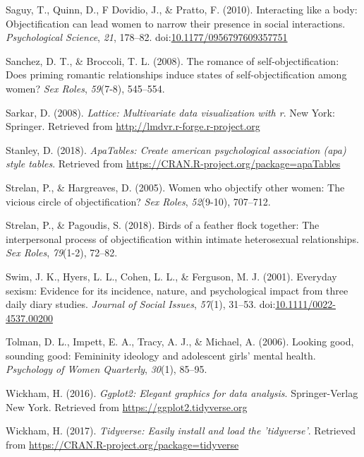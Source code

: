 \documentclass[man]{apa6}
\begin{document}
\hypertarget{ref-saguyetal2010}{}
Saguy, T., Quinn, D., F Dovidio, J., \& Pratto, F. (2010). Interacting
like a body: Objectification can lead women to narrow their presence in
social interactions. \emph{Psychological Science}, \emph{21}, 178--82.
doi:\href{https://doi.org/10.1177/0956797609357751}{10.1177/0956797609357751}

\hypertarget{ref-sanchez2008romance}{}
Sanchez, D. T., \& Broccoli, T. L. (2008). The romance of
self-objectification: Does priming romantic relationships induce states
of self-objectification among women? \emph{Sex Roles}, \emph{59}(7-8),
545--554.

\hypertarget{ref-R-lattice}{}
Sarkar, D. (2008). \emph{Lattice: Multivariate data visualization with
r}. New York: Springer. Retrieved from
\url{http://lmdvr.r-forge.r-project.org}

\hypertarget{ref-R-apaTables}{}
Stanley, D. (2018). \emph{ApaTables: Create american psychological
association (apa) style tables}. Retrieved from
\url{https://CRAN.R-project.org/package=apaTables}

\hypertarget{ref-strelan2005women}{}
Strelan, P., \& Hargreaves, D. (2005). Women who objectify other women:
The vicious circle of objectification? \emph{Sex Roles},
\emph{52}(9-10), 707--712.

\hypertarget{ref-strelan2018birds}{}
Strelan, P., \& Pagoudis, S. (2018). Birds of a feather flock together:
The interpersonal process of objectification within intimate
heterosexual relationships. \emph{Sex Roles}, \emph{79}(1-2), 72--82.

\hypertarget{ref-swimetal}{}
Swim, J. K., Hyers, L. L., Cohen, L. L., \& Ferguson, M. J. (2001).
Everyday sexism: Evidence for its incidence, nature, and psychological
impact from three daily diary studies. \emph{Journal of Social Issues},
\emph{57}(1), 31--53.
doi:\href{https://doi.org/10.1111/0022-4537.00200}{10.1111/0022-4537.00200}

\hypertarget{ref-tolman2006looking}{}
Tolman, D. L., Impett, E. A., Tracy, A. J., \& Michael, A. (2006).
Looking good, sounding good: Femininity ideology and adolescent girls'
mental health. \emph{Psychology of Women Quarterly}, \emph{30}(1),
85--95.

\hypertarget{ref-R-ggplot2}{}
Wickham, H. (2016). \emph{Ggplot2: Elegant graphics for data analysis}.
Springer-Verlag New York. Retrieved from
\url{https://ggplot2.tidyverse.org}

\hypertarget{ref-R-tidyverse}{}
Wickham, H. (2017). \emph{Tidyverse: Easily install and load the
'tidyverse'}. Retrieved from
\url{https://CRAN.R-project.org/package=tidyverse}
\end{document}
